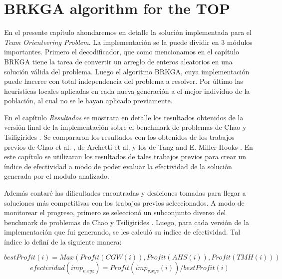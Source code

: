 
\chapter{BRKGA algorithm for the TOP}

En el presente capítulo ahondaremos en detalle la solución implementada para el \textit{Team Orienteering Problem}. La implementación se la puede dividir en 3 módulos importantes. Primero el decodificador, que como mencionamos en el capítulo BRKGA tiene la tarea de convertir un arreglo de enteros aleatorios en una solución válida del problema. Luego el algoritmo BRKGA, cuya implementación puede hacerce con total independencia del problema a resolver. Por último las heurísticas locales aplicadas en cada nueva generación a el mejor individuo de la población, al cual no se le hayan aplicado previamente. 

\bigskip

En el capítulo \textit{Resultados} se mostrara en detalle los resultados obtenidos de la versión final de la implementación sobre el benchmark de problemas de Chao y Tsiligirides \cite{IntancesChaoTsiligirides}. Se compararon los resultados con los obtenidos de los trabajos previos de Chao et al. \cite{ChaoGoldenWasil}, de Archetti et al. \cite{ArchettiHertzSperanza} y los de Tang and E. Miller-Hooks \cite{TangMillerHooks}. En este capítulo se utilizaran los resultados de tales trabajos previos para crear un índice de efectividad a modo de poder evaluar la efectividad de la solución generada por el modulo analizado.

\bigskip

Además contaré las dificultades encontradas y desiciones tomadas para llegar a soluciones más competitivas con los trabajos previos seleccionados. A modo de monitorear el progreso, primero se seleccionó un subconjunto diverso del benchmark de problemas de Chao y Tsiligirides \cite{IntancesChaoTsiligirides}. Luego, para cada versión de la implementación que fui generando, se les calculó su índice de efectividad. Tal índice lo definí de la siguiente manera:

\begin{equation*}
bestProfit(i) = Max(Profit(CGW(i)), Profit(AHS(i)), Profit(TMH(i)))
\end{equation*}
\begin{equation*}
efectividad(imp_{v.xyz}) = Profit(imp_{v.xyz}(i)) / bestProfit(i)
\end{equation*}

\bigskip

